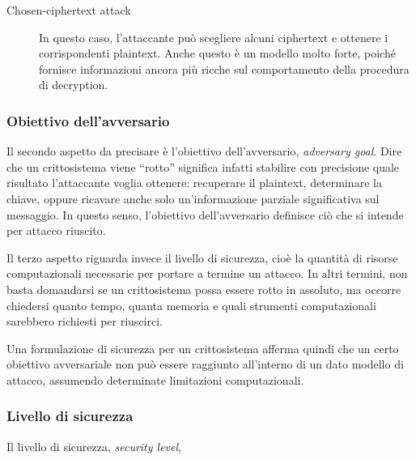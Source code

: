 \begin{description}
  \item[Chosen-ciphertext attack] In questo caso, l'attaccante può scegliere alcuni ciphertext e ottenere i
    corrispondenti plaintext. Anche questo è un modello molto forte, poiché fornisce informazioni ancora più ricche sul
    comportamento della procedura di decryption.
\end{description}

\subsubsection{Obiettivo dell'avversario}

Il secondo aspetto da precisare è l'obiettivo dell'avversario, \emph{adversary goal}. Dire che un crittosistema viene
``rotto'' significa infatti stabilire con precisione quale risultato l'attaccante voglia ottenere: recuperare il
plaintext, determinare la chiave, oppure ricavare anche solo un'informazione parziale significativa sul messaggio. In
questo senso, l'obiettivo dell'avversario definisce ciò che si intende per attacco riuscito.

Il terzo aspetto riguarda invece il livello di sicurezza, cioè la quantità di risorse computazionali necessarie per
portare a termine un attacco. In altri termini, non basta domandarsi se un crittosistema possa essere rotto in
assoluto, ma occorre chiedersi quanto tempo, quanta memoria e quali strumenti computazionali sarebbero richiesti per
riuscirci.

Una formulazione di sicurezza per un crittosistema afferma quindi che un certo obiettivo avversariale non può essere
raggiunto all'interno di un dato modello di attacco, assumendo determinate limitazioni computazionali.

\newpage

\subsubsection{Livello di sicurezza}

Il livello di sicurezza, \emph{security level},
